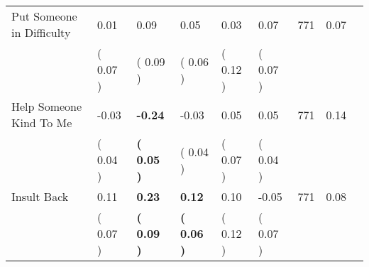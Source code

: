 \begin{tabular}{L{6.2cm} C{1.8cm} C{1.8cm} C{1.8cm} C{1.8cm} C{1.8cm} C{1.8cm} C{0.3cm} C{0.3cm}}
Put Someone in Difficulty &      0.01 &      0.09 &      0.05 &      0.03 &      0.07  & 771 &       0.07 \\ 
 & (     0.07 ) & (     0.09 ) & (     0.06 ) & (     0.12 ) & (     0.07 )  & \\
Help Someone Kind To Me &     -0.03 & \textbf{    -0.24} &     -0.03 &      0.05 &      0.05  & 771 &       0.14 \\ 
 & (     0.04 ) & \textbf{(     0.05 )} & (     0.04 ) & (     0.07 ) & (     0.04 )  & \\
Insult Back &      0.11 & \textbf{     0.23} & \textbf{     0.12} &      0.10 &     -0.05  & 771 &       0.08 \\ 
 & (     0.07 ) & \textbf{(     0.09 )} & \textbf{(     0.06 )} & (     0.12 ) & (     0.07 )  & \\
\bottomrule
\end{tabular}

